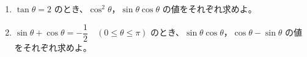 \documentclass[8pt,dvipdfmx]{article}[b5paper]
\begin{document}
\begin{tcolorbox}[title=数学\textcircled{\scriptsize 3} 1-4 AB]
  \begin{enumerate}[(1)]
    \item$\tan \theta = 2$ のとき、$\cos^2 \theta$，$\sin \theta \cos \theta$ の値をそれぞれ求めよ。
        \item$\sin \theta + \cos \theta = -\dfrac{1}{2} \quad (0 \leq \theta \leq \pi)$ のとき、$\sin \theta \cos \theta$，$\cos \theta - \sin \theta$ の値をそれぞれ求めよ。
  \end{enumerate}
\end{tcolorbox}
\end{document}
